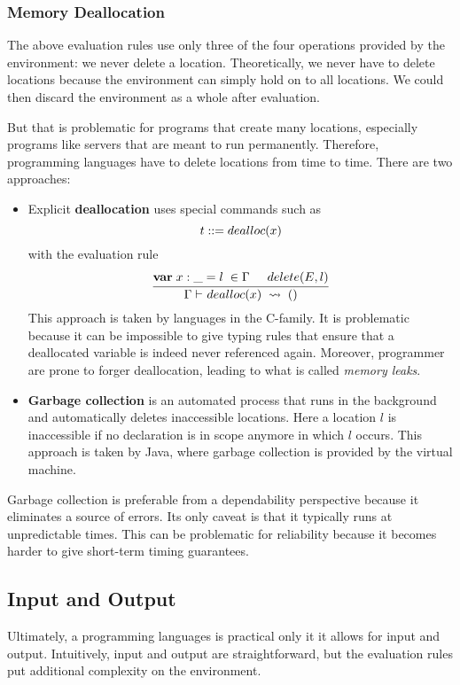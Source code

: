 \subsubsection{Memory Deallocation}

The above evaluation rules use only three of the four operations provided by the environment: we never delete a location.
Theoretically, we never have to delete locations because the environment can simply hold on to all locations.
We could then discard the environment as a whole after evaluation.

But that is problematic for programs that create many locations, especially programs like servers that are meant to run permanently.
Therefore, programming languages have to delete locations from time to time.
There are two approaches:
\begin{itemize}
\item Explicit \textbf{deallocation} uses special commands such as
 \[t ::= dealloc(x)\]
with the evaluation rule
\[\cfrac{{\rm \bf var}\; x:\_=l\;\in\Gamma \hspace*{.5cm} delete(E,l)}{\Gamma\vdash^{}_{}dealloc(x)\;\rightsquigarrow\;()}\,
\]
This approach is taken by languages in the C-family.
It is problematic because it can be impossible to give typing rules that ensure that a deallocated variable is indeed never referenced again.
Moreover, programmer are prone to forger deallocation, leading to what is called \emph{memory leaks}.
\item \textbf{Garbage collection} is an automated process that runs in the background and automatically deletes inaccessible locations.
Here a location $l$ is inaccessible if no declaration is in scope anymore in which $l$ occurs.
This approach is taken by Java, where garbage collection is provided by the virtual machine.
\end{itemize}

Garbage collection is preferable from a dependability perspective because it eliminates a source of errors.
Its only caveat is that it typically runs at unpredictable times.
This can be problematic for reliability because it becomes harder to give short-term timing guarantees.


\subsection{Input and Output}

Ultimately, a programming languages is practical only it it allows for input and output.
Intuitively, input and output are straightforward, but the evaluation rules put additional complexity on the environment.

